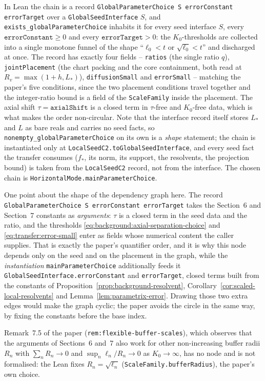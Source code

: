 In Lean the chain is a record \texttt{GlobalParameterChoice S errorConstant errorTarget}
over a \texttt{GlobalSeedInterface} $S$, and
\texttt{exists\_globalParameterChoice} inhabits it for every seed interface $S$, every
$\texttt{errorConstant}\geq0$ and every $\texttt{errorTarget}>0$: the
$K_0$-thresholds are collected into a single monotone funnel of the shape ``$\ell_0<t$ or
$\sqrt{\ell_0}<t$'' and discharged at once.  The record has exactly four fields --
\texttt{ratios} (the single ratio $q$), \texttt{jointPlacement} (the chart packing and the
core containment, both read at $R_v=\max(1+h,L_*)$), \texttt{diffusionSmall} and
\texttt{errorSmall} -- matching the paper's five conditions, since the two placement
conditions travel together and the integer-ratio bound is a field of the
\texttt{ScaleFamily} inside the placement.  The axial shift
$\tau=\texttt{axialShift}$ is a closed term in $\tau$-free and $K_0$-free data, which is
what makes the order non-circular.  Note that the
interface record itself stores $L_*$ and $L$ as bare reals and carries no seed facts, so
\texttt{nonempty\_globalParameterChoice} on its own is a \emph{shape} statement; the
chain is instantiated only at \texttt{LocalSeedC2.toGlobalSeedInterface}, and every seed
fact the transfer consumes ($f_*$, its norm, its support, the resolvents, the projection
bound) is taken from the \texttt{LocalSeedC2} record, not from the interface.  The chosen
chain is \texttt{HorizontalMode.mainParameterChoice}.

One point about the shape of the dependency graph here.  The record
\texttt{GlobalParameterChoice S errorConstant errorTarget} takes the Section~6 and
Section~7 constants
as \emph{arguments}: $\tau$ is a closed term in the seed data and the ratio, and the
thresholds \eqref{eq:background:axial-separation-choice} and \eqref{eq:transfer:error-small}
enter as fields whose numerical content the caller supplies.  That is exactly the paper's
quantifier order, and it is why this node depends
only on the seed and on the placement in the graph, while the \emph{instantiation}
\texttt{mainParameterChoice} additionally feeds it
\texttt{GlobalSeedInterface.errorConstant} and \texttt{errorTarget}, closed terms built from
the constants of Proposition~\ref{prop:background-resolvent},
Corollary~\ref{cor:scaled-local-resolvents} and Lemma~\ref{lem:parametrix-error}.  Drawing
those two extra edges would make the graph cyclic; the paper avoids the circle in the
same way, by fixing the constants before the base index.

Remark~7.5 of the paper (\texttt{rem:flexible-buffer-scales}), which observes that the
arguments of Sections~6 and~7 also work for other non-increasing buffer radii $R_n$ with
$\sum_nR_n\to0$ and $\sup_n\ell_n/R_n\to0$ as $K_0\to\infty$, has no node and is not
formalised: the Lean fixes $R_n=\sqrt{\ell_n}$ (\texttt{ScaleFamily.bufferRadius}), the
paper's own choice.

